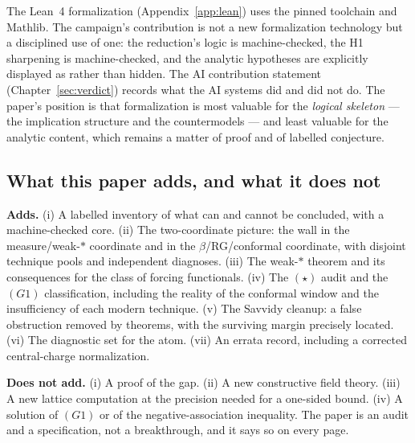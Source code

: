 The Lean~4 formalization (Appendix~\ref{app:lean}) uses the pinned toolchain and Mathlib. The
campaign's contribution is not a new formalization technology but a disciplined use of one: the
reduction's logic is machine-checked, the H1 sharpening is machine-checked, and the analytic
hypotheses are explicitly displayed as  rather than hidden. The AI contribution
statement (Chapter~\ref{sec:verdict}) records what the AI systems did and did not do. The
paper's position is that formalization is most valuable for the \emph{logical skeleton} --- the
implication structure and the countermodels --- and least valuable for the analytic content, which
remains a matter of proof and of labelled conjecture.

\subsection{What this paper adds, and what it does not}

\textbf{Adds.} (i) A labelled inventory of what can and cannot be concluded, with a
machine-checked core. (ii) The two-coordinate picture: the wall in the measure/weak-$*$
coordinate and in the $\beta$/RG/conformal coordinate, with disjoint technique pools and
independent diagnoses. (iii) The weak-$*$ theorem and its consequences for the class of forcing
functionals. (iv) The $(\star)$ audit and the $(G1)$ classification, including the reality of the
conformal window and the insufficiency of each modern technique. (v) The Savvidy cleanup: a false
obstruction removed by theorems, with the surviving margin precisely located. (vi) The diagnostic
set for the atom. (vii) An errata record, including a corrected central-charge normalization.

\textbf{Does not add.} (i) A proof of the gap. (ii) A new constructive field theory. (iii) A new
lattice computation at the precision needed for a one-sided bound. (iv) A solution of $(G1)$ or of
the negative-association inequality. The paper is an audit and a specification, not a
breakthrough, and it says so on every page.
